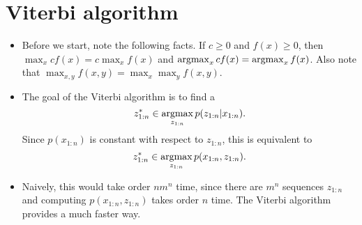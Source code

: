 \documentclass[12pt]{article}
\begin{document}
\section{Viterbi algorithm}

\begin{itemize}
\item Before we start, note the following facts. If $c \geq 0$ and $f(x) \geq 0$, then $\max_x c f(x) = c \max_x f(x)$ and $\operatorname*{argmax}_x c f(x) = \operatorname*{argmax}_x f(x)$. Also note that $\max_{x,y} f(x,y) = \max_x \max_y f(x,y)$.
\item The goal of the Viterbi algorithm is to find a
$$ z_{1:n}^* \in \operatorname*{argmax}_{z_{1:n}} p(z_{1:n} | x_{1:n}). $$
Since $p(x_{1:n})$ is constant with respect to $z_{1:n}$, this is equivalent to
$$ z_{1:n}^* \in \operatorname*{argmax}_{z_{1:n}} p(x_{1:n},z_{1:n}). $$
\item Naively, this would take order $n m^n$ time, since there are $m^n$ sequences $z_{1:n}$ and computing $p(x_{1:n},z_{1:n})$ takes order $n$ time. The Viterbi algorithm provides a much faster way.
\end{itemize}
\end{document}
